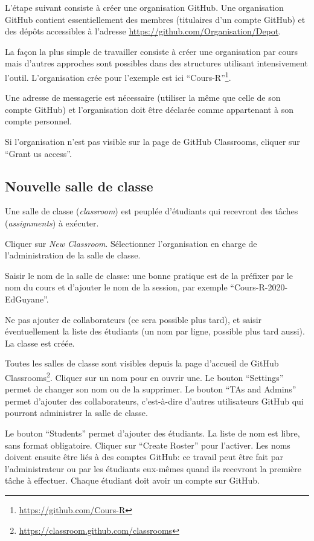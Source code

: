 \documentclass[
  12pt,
  french,
  a4paper,
  extrafontsizes,onecolumn,openright
  ]{memoir}
\begin{document}
L'étape suivant consiste à créer une organisation GitHub.
Une organisation GitHub contient essentiellement des membres (titulaires d'un compte GitHub) et des dépôts accessibles à l'adresse \url{https://github.com/Organisation/Depot}.

La façon la plus simple de travailler consiste à créer une organisation par cours mais d'autres approches sont possibles dans des structures utilisant intensivement l'outil.
L'organisation crée pour l'exemple est ici \enquote{Cours-R}\footnote{\url{https://github.com/Cours-R}}.

Une adresse de messagerie est nécessaire (utiliser la même que celle de son compte GitHub) et l'organisation doit être déclarée comme appartenant à son compte personnel.

Si l'organisation n'est pas visible sur la page de GitHub Classrooms, cliquer sur \enquote{Grant us access}.

\subsection{Nouvelle salle de classe}\label{nouvelle-salle-de-classe}

Une salle de classe (\emph{classroom}) est peuplée d'étudiants qui recevront des tâches (\emph{assignments}) à exécuter.

Cliquer sur \emph{New Classroom}.
Sélectionner l'organisation en charge de l'administration de la salle de classe.

Saisir le nom de la salle de classe: une bonne pratique est de la préfixer par le nom du cours et d'ajouter le nom de la session, par exemple \enquote{Cours-R-2020-EdGuyane}.

Ne pas ajouter de collaborateurs (ce sera possible plus tard), et saisir éventuellement la liste des étudiants (un nom par ligne, possible plus tard aussi).
La classe est créée.

Toutes les salles de classe sont visibles depuis la page d'accueil de GitHub Classrooms\footnote{\url{https://classroom.github.com/classrooms}}.
Cliquer sur un nom pour en ouvrir une.
Le bouton \enquote{Settings} permet de changer son nom ou de la supprimer.
Le bouton \enquote{TAs and Admins} permet d'ajouter des collaborateurs, c'est-à-dire d'autres utilisateurs GitHub qui pourront administrer la salle de classe.

Le bouton \enquote{Students} permet d'ajouter des étudiants.
La liste de nom est libre, sans format obligatoire.
Cliquer sur \enquote{Create Roster} pour l'activer.
Les noms doivent ensuite être liés à des comptes GitHub: ce travail peut être fait par l'administrateur ou par les étudiants eux-mêmes quand ils recevront la première tâche à effectuer.
Chaque étudiant doit avoir un compte sur GitHub.
\end{document}
